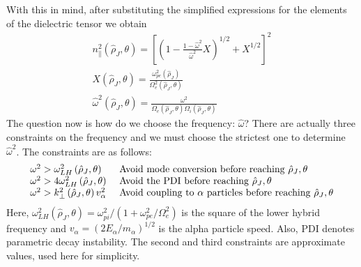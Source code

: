 With this in mind, after substituting the simplified expressions for the elements of the dielectric tensor we obtain
\begin{gather}
	\label{eq:lhcd_6}
	 n _ { \| } ^ { 2 } \left( \hat { \rho } _ { J } , \theta \right) = \left[ \left( 1 - \frac { 1 - \hat { \omega } ^ { 2 } } { \hat { \omega } ^ { 2 } } X \right) ^ { 1 / 2 } + X ^ { 1 / 2 } \right] ^ { 2 } \\
	 X \left( \hat { \rho } _ { J } , \theta \right) = \frac{ \omega _ { p e } ^ { 2 } \left( \hat { \rho } _ { J } \right) }{\Omega _ { e } ^ { 2 } \left( \hat { \rho } _ { J } , \theta \right) } \\
	 \hat { \omega } ^ { 2 } \left( \hat { \rho } _ { J } , \theta \right) = \frac{ \omega ^ { 2 } }{ \Omega _ { e } \left( \hat { \rho } _ { J } , \theta \right) \Omega _ { i } \left( \hat { \rho } _ { J } , \theta \right) }
\end{gather}
The question now is how do we choose the frequency: $\hat \omega$? There are actually three constraints on the frequency and we must choose the strictest one to determine $\hat \omega^2$. The constraints are as follows:
\begin{equation}
	\begin{array} { l l } { \omega ^ { 2 } > \omega _ { L H } ^ { 2 } \left( \hat { \rho } _ { J } , \theta \right) } & { \text { Avoid mode conversion before reaching } \hat { \rho } _ { J } , \theta } \\ { \omega ^ { 2 } > 4 \omega _ { L H } ^ { 2 } \left( \hat { \rho } _ { J } , \theta \right) } & { \text { Avoid the PDI before reaching } \hat { \rho } _ { J } , \theta } \\ { \omega ^ { 2 } > k _ { \perp } ^ { 2 } \left( \hat { \rho } _ { J } , \theta \right) v _ { \alpha } ^ { 2 } } & { \text { Avoid coupling to } \alpha \text { particles before reaching } \hat { \rho } _ { J } , \theta } \end{array}
\end{equation}
Here, $\omega _ { L H } ^ { 2 } \left( \hat { \rho } _ { J } , \theta \right) = \omega _ { p i } ^ { 2 } / \left( 1 + \omega _ { p e } ^ { 2 } / \Omega _ { e } ^ { 2 } \right)$ is the square of the lower hybrid frequency and $v _ { \alpha } = \left( 2 E _ { \alpha } / m _ { \alpha } \right) ^ { 1 / 2 }$ is the alpha particle speed. Also, PDI denotes  parametric decay instability. The second and third constraints are approximate values, used here for simplicity.

